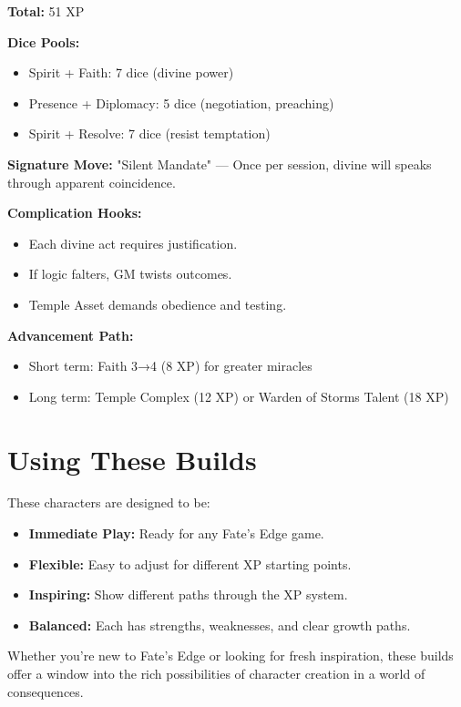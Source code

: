 \textbf{Total:} 51 XP

\textbf{Dice Pools:}
\begin{itemize}
  \item Spirit + Faith: 7 dice (divine power)
  \item Presence + Diplomacy: 5 dice (negotiation, preaching)
  \item Spirit + Resolve: 7 dice (resist temptation)
\end{itemize}

\textbf{Signature Move:} "Silent Mandate" — Once per session, divine will speaks through apparent coincidence.

\textbf{Complication Hooks:}
\begin{itemize}
  \item Each divine act requires justification.
  \item If logic falters, GM twists outcomes.
  \item Temple Asset demands obedience and testing.
\end{itemize}

\textbf{Advancement Path:}
\begin{itemize}
  \item Short term: Faith 3→4 (8 XP) for greater miracles
  \item Long term: Temple Complex (12 XP) or Warden of Storms Talent (18 XP)
\end{itemize}

\section{Using These Builds}

These characters are designed to be:
\begin{itemize}
  \item \textbf{Immediate Play:} Ready for any Fate's Edge game.
  \item \textbf{Flexible:} Easy to adjust for different XP starting points.
  \item \textbf{Inspiring:} Show different paths through the XP system.
  \item \textbf{Balanced:} Each has strengths, weaknesses, and clear growth paths.
\end{itemize}

Whether you're new to Fate's Edge or looking for fresh inspiration, these builds offer a window into the rich possibilities of character creation in a world of consequences.

